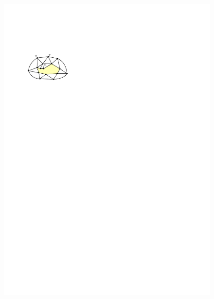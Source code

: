 \documentclass[a4paper,UKenglish,cleveref, autoref, thm-restate]{lipics-v2021}
\begin{document}
\begin{figure}
  \includegraphics[page=2]{figs/2_3_figure}

\end{figure}
\end{document}
